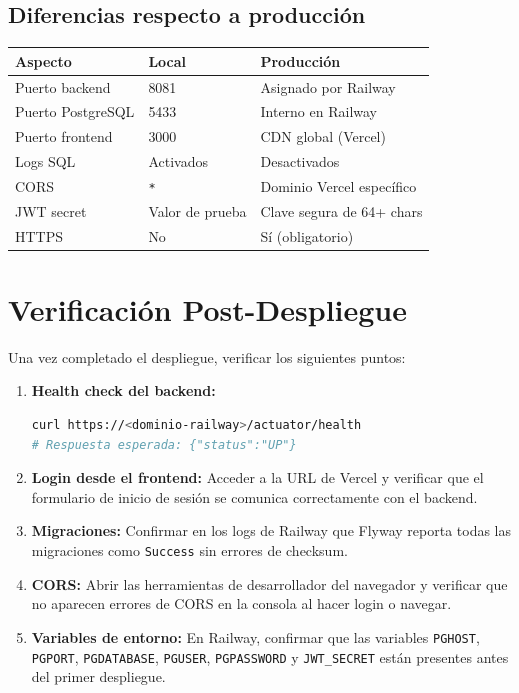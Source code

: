\documentclass[11pt, a4paper]{article}
\begin{document}
\subsection{Diferencias respecto a producción}

\begin{center}
\begin{tabular}{L{4.5cm} L{3.5cm} L{5cm}}
\toprule
\textbf{Aspecto} & \textbf{Local} & \textbf{Producción} \\
\midrule
Puerto backend     & 8081         & Asignado por Railway \\
Puerto PostgreSQL  & 5433         & Interno en Railway \\
Puerto frontend    & 3000         & CDN global (Vercel) \\
Logs SQL           & Activados    & Desactivados \\
CORS               & \texttt{*}   & Dominio Vercel específico \\
JWT secret         & Valor de prueba & Clave segura de 64+ chars \\
HTTPS              & No           & Sí (obligatorio) \\
\bottomrule
\end{tabular}
\end{center}

\section{Verificación Post-Despliegue}

Una vez completado el despliegue, verificar los siguientes puntos:

\begin{enumerate}
  \item \textbf{Health check del backend:}
\begin{lstlisting}[language=bash]
curl https://<dominio-railway>/actuator/health
# Respuesta esperada: {"status":"UP"}
\end{lstlisting}

  \item \textbf{Login desde el frontend:} Acceder a la URL de Vercel y verificar que el formulario de inicio de sesión se comunica correctamente con el backend.

  \item \textbf{Migraciones:} Confirmar en los logs de Railway que Flyway reporta todas las migraciones como \texttt{Success} sin errores de checksum.

  \item \textbf{CORS:} Abrir las herramientas de desarrollador del navegador y verificar que no aparecen errores de CORS en la consola al hacer login o navegar.

  \item \textbf{Variables de entorno:} En Railway, confirmar que las variables \texttt{PGHOST}, \texttt{PGPORT}, \texttt{PGDATABASE}, \texttt{PGUSER}, \texttt{PGPASSWORD} y \texttt{JWT\_SECRET} están presentes antes del primer despliegue.
\end{enumerate}
\end{document}
